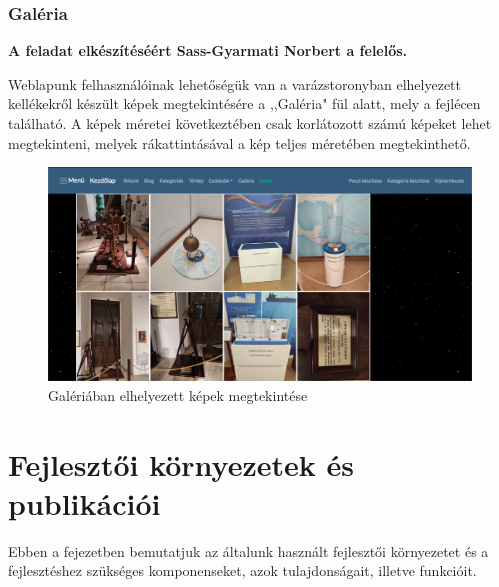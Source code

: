 \documentclass[
]{thesis-ekf}
\theoremstyle{definition}
\theoremstyle{remark}
\begin{document}
		\subsection{Galéria}
			\textbf{A feladat elkészítéséért Sass-Gyarmati Norbert a felelős.} 
			\par Weblapunk felhasználóinak lehetőségük van a varázstoronyban elhelyezett kellékekről készült képek megtekintésére a ,,Galéria" fül alatt, mely a fejlécen található. A képek méretei következtében csak korlátozott számú képeket lehet megtekinteni, melyek rákattintásával a kép teljes méretében megtekinthető. 
			\begin{figure}[ht]
				\centering
				\includegraphics[scale=0.30]{./images/gallery}
				\caption{Galériában elhelyezett képek megtekintése}
				\label{fig:contactme}
			\end{figure}
			

\chapter{Fejlesztői környezetek és publikációi}
	\par Ebben a fejezetben bemutatjuk az általunk használt fejlesztői környezetet és a fejlesztéshez szükséges komponenseket, azok tulajdonságait, illetve funkcióit.
\end{document}
